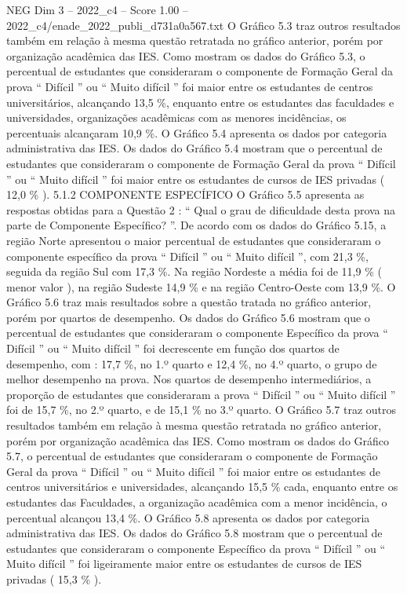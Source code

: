 \begin{textsample}{NEG Dim 3 – 2022\_c4 – Score 1.00 – 2022\_c4/enade\_2022\_publi\_d731a0a567.txt}
O Gráfico 5.3 traz outros resultados também em relação à mesma questão retratada no gráfico anterior, porém por organização acadêmica das IES.
Como mostram os dados do Gráfico 5.3, o percentual de estudantes que consideraram o componente de Formação Geral da prova “ Difícil ” ou “ Muito difícil ” foi maior entre os estudantes de centros universitários, alcançando 13,5 \%, enquanto entre os estudantes das faculdades e universidades, organizações acadêmicas com as menores incidências, os percentuais alcançaram 10,9 \%.
O Gráfico 5.4 apresenta os dados por categoria administrativa das IES.
Os dados do Gráfico 5.4 mostram que o percentual de estudantes que consideraram o componente de Formação Geral da prova “ Difícil ” ou “ Muito difícil ” foi maior entre os estudantes de cursos de IES privadas ( 12,0 \% ). 5.1.2 COMPONENTE ESPECÍFICO O Gráfico 5.5 apresenta as respostas obtidas para a Questão 2 : “ Qual o grau de dificuldade desta prova na parte de Componente Específico? ”.
De acordo com os dados do Gráfico 5.15, a região Norte apresentou o maior percentual de estudantes que consideraram o componente específico da prova “ Difícil ” ou “ Muito difícil ”, com 21,3 \%, seguida da região Sul com 17,3 \%.
Na região Nordeste a média foi de 11,9 \% ( menor valor ), na região Sudeste 14,9 \% e na região Centro-Oeste com 13,9 \%.
O Gráfico 5.6 traz mais resultados sobre a questão tratada no gráfico anterior, porém por quartos de desempenho.
Os dados do Gráfico 5.6 mostram que o percentual de estudantes que consideraram o componente Específico da prova “ Difícil ” ou “ Muito difícil ” foi decrescente em função dos quartos de desempenho, com : 17,7 \%, no 1.º quarto e 12,4 \%, no 4.º quarto, o grupo de melhor desempenho na prova.
Nos quartos de desempenho intermediários, a proporção de estudantes que consideraram a prova “ Difícil ” ou “ Muito difícil ” foi de 15,7 \%, no 2.º quarto, e de 15,1 \% no 3.º quarto.
O Gráfico 5.7 traz outros resultados também em relação à mesma questão retratada no gráfico anterior, porém por organização acadêmica das IES.
Como mostram os dados do Gráfico 5.7, o percentual de estudantes que consideraram o componente de Formação Geral da prova “ Difícil ” ou “ Muito difícil ” foi maior entre os estudantes de centros universitários e universidades, alcançando 15,5 \% cada, enquanto entre os estudantes das Faculdades, a organização acadêmica com a menor incidência, o percentual alcançou 13,4 \%.
O Gráfico 5.8 apresenta os dados por categoria administrativa das IES.
Os dados do Gráfico 5.8 mostram que o percentual de estudantes que consideraram o componente Específico da prova “ Difícil ” ou “ Muito difícil ” foi ligeiramente maior entre os estudantes de cursos de IES privadas ( 15,3 \% ).

\end{textsample}
